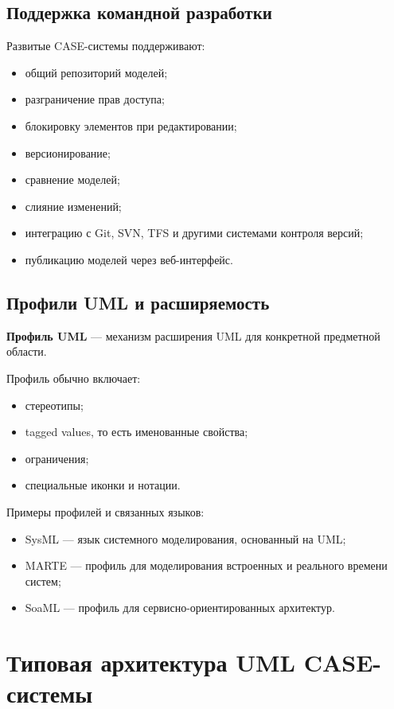 \documentclass[12pt,a4paper]{article}
\begin{document}
\subsection{Поддержка командной разработки}

Развитые CASE-системы поддерживают:
\begin{itemize}
    \item общий репозиторий моделей;
    \item разграничение прав доступа;
    \item блокировку элементов при редактировании;
    \item версионирование;
    \item сравнение моделей;
    \item слияние изменений;
    \item интеграцию с Git, SVN, TFS и другими системами контроля версий;
    \item публикацию моделей через веб-интерфейс.
\end{itemize}

\subsection{Профили UML и расширяемость}

\textbf{Профиль UML} --- механизм расширения UML для конкретной предметной области.

Профиль обычно включает:
\begin{itemize}
    \item стереотипы;
    \item tagged values, то есть именованные свойства;
    \item ограничения;
    \item специальные иконки и нотации.
\end{itemize}

Примеры профилей и связанных языков:
\begin{itemize}
    \item SysML --- язык системного моделирования, основанный на UML;
    \item MARTE --- профиль для моделирования встроенных и реального времени систем;
    \item SoaML --- профиль для сервисно-ориентированных архитектур.
\end{itemize}

\section{Типовая архитектура UML CASE-системы}
\end{document}
